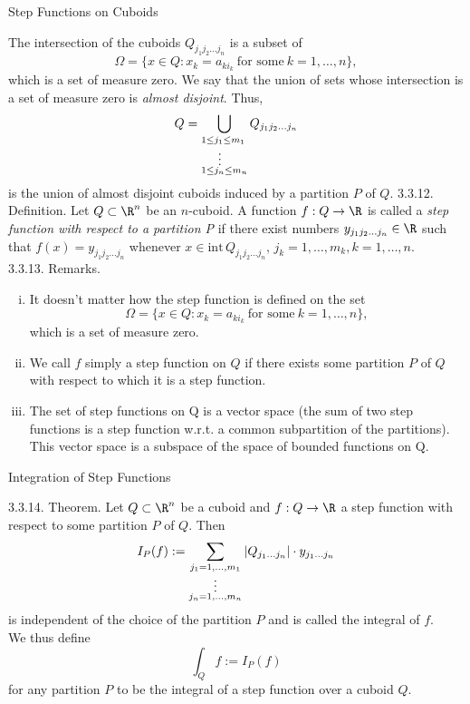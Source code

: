 \documentclass[smaller,hyperref={CJKbookmarks=true}]{beamer}
\begin{document}
\begin{frame}{Step Functions on Cuboids}
\begin{spacing}{1.1}
The intersection of the cuboids $Q_{j_1j_2...j_n}$ is a subset of
\[\Omega=\{x\in Q:x_k=a_{ki_k}~\text{for some}~k=1,\ldots,n\},\]
which is a set of measure zero. We say that the union of sets whose
intersection is a set of measure zero is \emph{almost disjoint}. Thus,
\[Q=\bigcup_{\begin{subarray}
               ~1\leq j_1\leq m_1\\
               ~~~~\vdots\\
               1\leq j_n\leq m_n
             \end{subarray}}Q_{j_1j_2...j_n}\]
is the union of almost disjoint cuboids induced by a partition $P$ of $Q$.
\newpage
\alert{3.3.12. Definition.} Let $Q\subset\R^n$ be an $n$-cuboid. A function $f:Q\to\R$ is called a \emph{step function with respect to a partition P} if there exist numbers $y_{j_1j_2...j_n}\in\R$ such that $f(x)=y_{j_1j_2...j_n}$ whenever $x\in\text{int}\,Q_{j_1j_2...j_n},\,j_k=1,\ldots
,m_k,k=1,\ldots,n$.\\[5pt]
\alert{3.3.13. Remarks.}
\begin{enumerate}[(i)]
  \item It doesn't matter how the step function is defined on the set
      \[\Omega=\{x\in Q:x_k=a_{ki_k}~\text{for some}~k=1,\ldots,n\},\]
      which is a set of measure zero.
  \item We call $f$ simply a step function on $Q$ if there exists some partition $P$
of $Q$ with respect to which it is a step function.
  \item The set of step functions on Q is a vector space (the sum of two step
functions is a step function w.r.t. a common subpartition of the
partitions). This vector space is a subspace of the space of bounded
functions on Q.
\end{enumerate}
\end{spacing}
\end{frame}
\begin{frame}[t]{Integration of Step Functions}
\begin{spacing}{1.1}
\alert{3.3.14. Theorem.} Let $Q\subset\R^n$ be a cuboid and $f:Q\to\R$ a step function with respect to some partition $P$ of $Q$. Then
\[I_P(f):=\sum_{\begin{subarray}{c}
                  j_1=1,...,m_1\\
                  \vdots\\
                  j_n=1,...,m_n
                \end{subarray}}\left|Q_{j_1...j_n}\right|\cdot y_{j_1...j_n}\]
is independent of the choice of the partition $P$ and is called the integral of
$f$.\\
We thus define
\[\int_Qf:=I_P(f)\]
for any partition $P$ to be the integral of a step function over a cuboid $Q$.
\end{spacing}
\end{frame}
\end{document}
